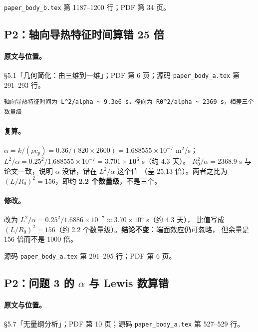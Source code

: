 \documentclass[11pt,a4paper]{ctexart}
\newcommand{\src}[1]{\texttt{#1}}
\newcommand{\loc}[1]{\textcolor{blue!60!black}{#1}}
\begin{document}
\loc{\src{paper\_body\_b.tex} 第 1187--1200 行；PDF 第 34 页}。

\subsection{P2：轴向导热特征时间算错 25 倍}

\paragraph{原文与位置。}\loc{§5.1「几何简化：由三维到一维」；PDF 第 6 页；源码 \src{paper\_body\_a.tex} 第 291--293 行}。

\begin{lstlisting}[style=old]
轴向导热特征时间为 L^2/alpha ~ 9.3e6 s，径向为 R0^2/alpha ~ 2369 s，相差三个数量级
\end{lstlisting}

\paragraph{复算。}$\alpha=k/(\rho c_p)=0.36/(820\times2600)=1.688555\times10^{-7}$ m$^2$/s；
$L^2/\alpha=0.25^2/1.688555\times10^{-7}=\mathbf{3.701\times10^5}$ s（约 4.3 天）。
$R_0^2/\alpha=2368.9$ s 与论文一致，说明 $\alpha$ 没错，错在 $L^2/\alpha$ 这个值
（差 $25.13$ 倍）。两者之比为 $(L/R_0)^2=156$，即约 \textbf{2.2 个数量级}，不是三个。

\paragraph{修改。}改为 $L^2/\alpha=0.25^2/1.6886\times10^{-7}\approx3.70\times10^5$ s（约 4.3 天），
比值写成 $(L/R_0)^2=156$（约 2.2 个数量级）。\textbf{结论不变}：端面效应仍可忽略，
但余量是 156 倍而不是 1000 倍。

\loc{源码 \src{paper\_body\_a.tex} 第 291--295 行；PDF 第 6 页}。

\subsection{P2：问题 3 的 $\alpha$ 与 Lewis 数算错}

\paragraph{原文与位置。}\loc{§5.7「无量纲分析」；PDF 第 10 页；源码 \src{paper\_body\_a.tex} 第 527--529 行}。
\end{document}

